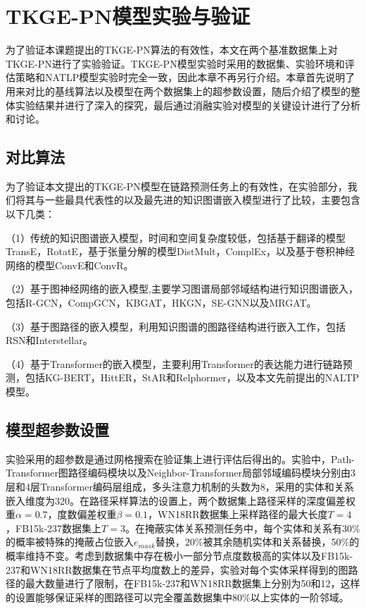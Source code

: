 \chapter{TKGE-PN模型实验与验证}
为了验证本课题提出的TKGE-PN算法的有效性，本文在两个基准数据集上对TKGE-PN进行了实验验证。TKGE-PN模型实验时采用的数据集、实验环境和评估策略和NATLP模型实验时完全一致，因此本章不再另行介绍。本章首先说明了用来对比的基线算法以及模型在两个数据集上的超参数设置，随后介绍了模型的整体实验结果并进行了深入的探究，最后通过消融实验对模型的关键设计进行了分析和讨论。

\section{对比算法}

为了验证本文提出的TKGE-PN模型在链路预测任务上的有效性，在实验部分，我们将其与一些最具代表性的以及最先进的知识图谱嵌入模型进行了比较，主要包含以下几类：

（1）传统的知识图谱嵌入模型，时间和空间复杂度较低，包括基于翻译的模型TransE，RotatE，基于张量分解的模型DistMult，ComplEx，以及基于卷积神经网络的模型ConvE和ConvR。

（2）基于图神经网络的嵌入模型,主要学习图谱局部邻域结构进行知识图谱嵌入，包括R-GCN，CompGCN，KBGAT，HKGN，SE-GNN以及MRGAT。

（3）基于图路径的嵌入模型，利用知识图谱的图路径结构进行嵌入工作，包括RSN和Interstellar。 

（4）基于Transformer的嵌入模型，主要利用Transformer的表达能力进行链路预测，包括KG-BERT，HittER，StAR和Relphormer，以及本文先前提出的NALTP模型。

\section{模型超参数设置}

实验采用的超参数是通过网格搜索在验证集上进行评估后得出的。实验中，Path-Transformer图路径编码模块以及Neighbor-Transformer局部邻域编码模块分别由3层和4层Transformer编码层组成，多头注意力机制的头数为8，采用的实体和关系嵌入维度为320。在路径采样算法的设置上，两个数据集上路径采样的深度偏差权重$\alpha = 0.7$，度数偏差权重$\beta=0.1$，WN18RR数据集上采样路径的最大长度$T=4$，FB15k-237数据集上$T=3$。在掩蔽实体关系预测任务中，每个实体和关系有30\%的概率被特殊的掩蔽占位嵌入$e_{mask}$替换，20\%被其余随机实体和关系替换，50\%的概率维持不变。考虑到数据集中存在极小一部分节点度数极高的实体以及FB15k-237和WN18RR数据集在节点平均度数上的差异，实验对每个实体采样得到的图路径的最大数量进行了限制，在FB15k-237和WN18RR数据集上分别为50和12，这样的设置能够保证采样的图路径可以完全覆盖数据集中80\%以上实体的一阶邻域。

